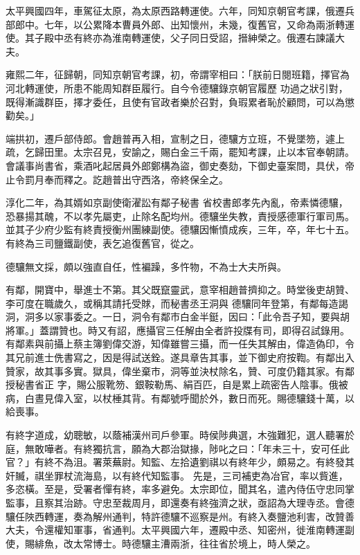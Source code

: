 \begin{pinyinscope}
 太平興國四年，車駕征太原，為太原西路轉運使。六年，同知京朝官考課，俄遷兵部郎中。七年，以公累降本曹員外郎、出知懷州，未幾，復舊官，又命為兩浙轉運使。其子殿中丞有終亦為淮南轉運使，父子同日受詔，搢紳榮之。俄遷右諫議大夫。



 雍熙二年，征歸朝，同知京朝官考課，初，帝謂宰相曰：「朕前日閱班籍，擇官為河北轉運使，所患不能周知群臣履行。自今令德驤錄京朝官履歷
 功過之狀引對，既得漸識群臣，擇才委任，且使有官政者樂於召對，負瑕累者恥於顧問，可以為懲勸矣。」



 端拱初，遷戶部侍郎。會趙普再入相，宣制之日，德驤方立班，不覺墜笏，遽上疏，乞歸田里。太宗召見，安諭之，賜白金三千兩，罷知考課，止以本官奉朝請。會議事尚書省，乘酒叱起居員外郎鄭構為盜，御史奏劾，下御史臺案問，具伏，帝止令罰月奉而釋之。訖趙普出守西洛，帝終保全之。



 淳化二年，為其婿如京副使衛濯訟有鄰子秘書
 省校書郎孝先內亂，帝素憐德驤，恐暴揚其醜，不以孝先屬吏，止除名配均州。德驤坐失教，責授感德軍行軍司馬。並其子少府少監有終責授衡州團練副使。德驤因慚憤成疾，三年，卒，年七十五。有終為三司鹽鐵副使，表乞追復舊官，從之。



 德驤無文採，頗以強直自任，性褊躁，多忤物，不為士大夫所與。



 有鄰，開寶中，舉進士不第。其父既竄靈武，意宰相趙普擠抑之。時堂後吏胡贊、李可度在職歲久，或稱其請托受賕，而秘書丞王洞與
 德驤同年登第，有鄰每造謁洞，洞多以家事委之。一日，洞令有鄰市白金半鋌，因曰：「此令吾子知，要與胡將軍。」蓋謂贊也。時又有詔，應攝官三任解由全者許投牒有司，即得召試錄用。有鄰素與前攝上蔡主簿劉偉交游，知偉雖嘗三攝，而一任失其解由，偉造偽印，令其兄前進士侁書寫之，因是得試送銓。遂具章告其事，並下御史府按鞫。有鄰出入贊家，故其事多實。獄具，偉坐棄市，洞等並決杖除名，贊、可度仍籍其家。有鄰授秘書省正
 字，賜公服靴笏、銀鞍勒馬、絹百匹，自是累上疏密告人陰事。俄被病，白晝見偉入室，以杖棰其背。有鄰號呼聞於外，數日而死。賜德驤錢十萬，以給喪事。



 有終字道成，幼聰敏，以蔭補漢州司戶參軍。時侯陟典選，木強難犯，選人聽署於庭，無敢嘩者。有終獨抗言，願為大郡治獄掾，陟叱之曰：「年未三十，安可任此官？」有終不為沮。署萊蕪尉。知監、左拾遺劉祺以有終年少，頗易之。有終發其奸贓，祺坐罪杖流海島，以有終代知監事。
 先是，三司補吏為冶官，率以貲進，多恣橫。至是，受署者憚有終，率多避免。太宗即位，聞其名，遣內侍伍守忠同掌監事，且察其治跡。守忠至裁周月，即還奏有終強濟之狀，亟詔為大理寺丞。會德驤任陜西轉運，奏為解州通判，特許德驤不巡察是州。有終入奏鹽池利害，改贊善大夫，令還權知軍事，省通判。太平興國六年，遷殿中丞、知密州，徙淮南轉運副使，賜緋魚，改太常博士。時德驤主漕兩浙，往往省於境上，時人榮之。




\end{pinyinscope}
